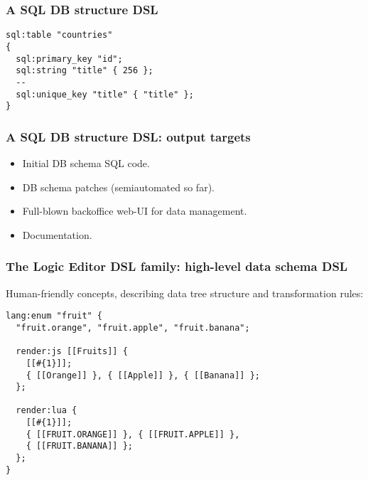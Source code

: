 \documentclass[handout]{beamer}
\begin{document}

\begin{frame}[fragile]

\frametitle{A SQL DB structure DSL}

\begin{verbatim}
sql:table "countries"
{
  sql:primary_key "id";
  sql:string "title" { 256 };
  --
  sql:unique_key "title" { "title" };
}
\end{verbatim}

\end{frame}


\begin{frame}

\frametitle{A SQL DB structure DSL: output targets}

\begin{itemize}
\item Initial DB schema SQL code.
\item DB schema patches (semiautomated so far).
\item Full-blown backoffice web-UI for data management.
\item Documentation.
\end{itemize}

\end{frame}


\begin{frame}[fragile]

\frametitle{The Logic Editor DSL family: high-level data schema DSL}

Human-friendly concepts, describing data tree structure and transformation rules:

\begin{verbatim}
lang:enum "fruit" {
  "fruit.orange", "fruit.apple", "fruit.banana";

  render:js [[Fruits]] {
    [[#{1}]];
    { [[Orange]] }, { [[Apple]] }, { [[Banana]] };
  };

  render:lua {
    [[#{1}]];
    { [[FRUIT.ORANGE]] }, { [[FRUIT.APPLE]] },
    { [[FRUIT.BANANA]] };
  };
}
\end{verbatim}

\end{frame}
\end{document}
